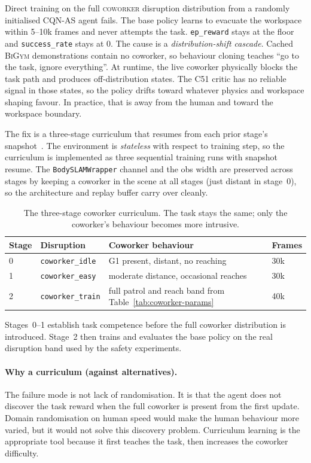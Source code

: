 \documentclass[11pt,a4paper]{report}
\newcommand{\bigym}{\textsc{BiGym}}
\newcommand{\cqnas}{CQN-AS}
\newcommand{\coworker}{\textsc{coworker}}
\begin{document}
Direct training on the full \coworker{} disruption distribution from a
randomly initialised \cqnas{} agent fails. The base policy learns to
evacuate the workspace within 5--10k frames and never attempts the
task. \texttt{ep\_reward} stays at the floor and
\texttt{success\_rate} stays at 0. The cause is a
\emph{distribution-shift cascade}. Cached \bigym{} demonstrations
contain no coworker, so behaviour cloning teaches ``go to the task,
ignore everything''. At runtime, the live coworker physically blocks
the task path and produces off-distribution states. The C51 critic has
no reliable signal in those states, so the policy drifts toward
whatever physics and workspace shaping favour. In practice, that is
away from the human and toward the workspace boundary.

The fix is a three-stage curriculum that resumes from each prior
stage's snapshot~\cite{narvekar2020curriculum}. The environment is
\emph{stateless} with respect to training step, so the curriculum
is implemented as three sequential training runs with snapshot
resume. The \texttt{BodySLAMWrapper} channel and the obs width are
preserved across stages by keeping a coworker in the scene at all
stages (just distant in stage~0), so the architecture and replay
buffer carry over cleanly.

\begin{table}[htbp]
\centering
\small
\caption{The three-stage coworker curriculum. The task stays the same;
only the coworker's behaviour becomes more intrusive.}
\label{tab:curriculum-stages}
\begin{tabular}{llll}
\toprule
Stage & Disruption & Coworker behaviour & Frames \\
\midrule
0 & \texttt{coworker\_idle} & G1 present, distant, no reaching & 30k \\
1 & \texttt{coworker\_easy} & moderate distance, occasional reaches & 30k \\
2 & \texttt{coworker\_train} & full patrol and reach band from Table~\ref{tab:coworker-params} & 40k \\
\bottomrule
\end{tabular}
\end{table}

Stages~0--1 establish task competence before the full coworker
distribution is introduced. Stage~2 then trains and evaluates the base
policy on the real disruption band used by the safety experiments.

\paragraph{Why a curriculum (against alternatives).}
The failure mode is not lack of randomisation. It is that the agent
does not discover the task reward when the full coworker is present
from the first update. Domain randomisation on human speed would make
the human behaviour more varied, but it would not solve this discovery
problem. Curriculum learning is the appropriate tool because it first
teaches the task, then increases the coworker difficulty.
\end{document}
